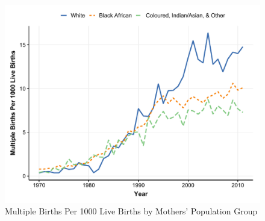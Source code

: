 
\begin{figure}[!th]
\centering
\caption{\label{fig:line-pp}Multiple Births Per 1000 Live Births by Mothers' Population Group}
\includegraphics[width=\textwidth]{figures/line_pp.pdf}
\end{figure}

 
\pagebreak



